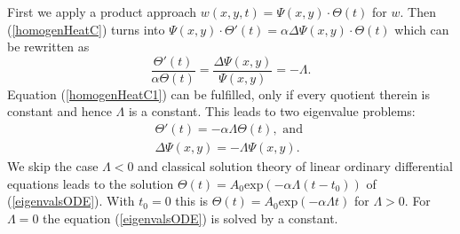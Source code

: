 \documentclass[a4paper,11pt]{article}
\theoremstyle{plain} %
\theoremstyle{definition} %
\theoremstyle{remark} %
\theoremstyle{remark}
\def\wTemp{w}
\def\Laplace{\Delta}
\begin{document}
First we apply a product approach $\wTemp (x,y,t) = \Psi (x,y) \cdot \Theta (t) $ for $ \wTemp $. Then (\ref{homogenHeatC}) turns into $ \Psi (x,y) \cdot \Theta' (t) = \alpha\Laplace \Psi (x,y) \cdot \Theta (t) $ which can be rewritten as
\begin{equation}\label{homogenHeatC1}
\frac{\Theta' (t)}{\alpha \Theta (t) } = \frac{\Laplace \Psi (x,y) }{\Psi (x,y) } = -\Lambda .
\end{equation}
Equation (\ref{homogenHeatC1}) can be fulfilled, only if every quotient therein is constant and hence $ \Lambda $ is a constant. This leads to two eigenvalue problems:
\begin{eqnarray} 
\Theta' (t) = -\alpha \Lambda \Theta (t) , \text{ and } \label{eigenvalsODE}\\
\Laplace \Psi (x,y) = -\Lambda \Psi (x,y) . \label{eigenvalsLaplace}
\end{eqnarray}
We skip the case $ \Lambda < 0 $ and classical solution theory of linear ordinary differential equations leads to the solution $ \Theta (t) = A_0 \mathrm{exp}(-\alpha\Lambda (t-t_0)) $ of (\ref{eigenvalsODE}). With $t_0 = 0$ this is $ \Theta (t) = A_0 \mathrm{exp}(-\alpha\Lambda t) $ for $ \Lambda > 0 $. For $ \Lambda = 0$ the equation (\ref{eigenvalsODE}) is solved by a constant. 
\end{document}
